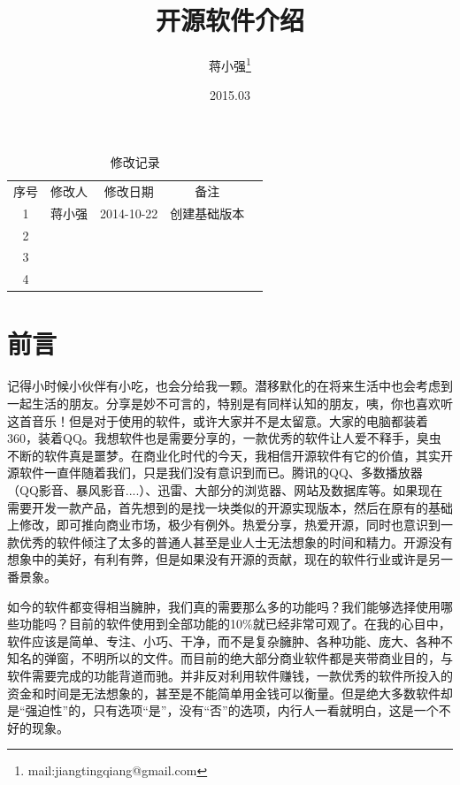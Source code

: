 \documentclass[paper=a4,fontsize=11pt]{article}
\begin{document}
	\title{开源软件介绍}		
	\author{蒋小强\footnote{mail:jiangtingqiang@gmail.com}}
	\date{2015.03}	
	
	\maketitle %
	\clearpage
	
	\begin{table}\caption{修改记录}					
		\medskip
		\centering		
		\begin{tabular}{|c|c|c|c|c|}
			\hline
			\multirow{1}{*}{序号}
			& \multicolumn{1}{|c|}{修改人}  
			& \multicolumn{1}{|c|}{修改日期} 
			& \multicolumn{1}{|c|}{备注}\\			
			\cline{1-4}
			1 & 蒋小强 & 2014-10-22 & 创建基础版本\\
			\hline
			2 & & &\\
			\hline
			3 & & &\\
			\hline
			4 & & &\\
			\hline
		\end{tabular}
	\end{table}
	\clearpage
	\section{前言}
	
	记得小时候小伙伴有小吃，也会分给我一颗。潜移默化的在将来生活中也会考虑到一起生活的朋友。分享是妙不可言的，特别是有同样认知的朋友，咦，你也喜欢听这首音乐！但是对于使用的软件，或许大家并不是太留意。大家的电脑都装着360，装着QQ。我想软件也是需要分享的，一款优秀的软件让人爱不释手，臭虫不断的软件真是噩梦。在商业化时代的今天，我相信开源软件有它的价值，其实开源软件一直伴随着我们，只是我们没有意识到而已。腾讯的QQ、多数播放器（QQ影音、暴风影音....）、迅雷、大部分的浏览器、网站及数据库等。如果现在需要开发一款产品，首先想到的是找一块类似的开源实现版本，然后在原有的基础上修改，即可推向商业市场，极少有例外。热爱分享，热爱开源，同时也意识到一款优秀的软件倾注了太多的普通人甚至是业人士无法想象的时间和精力。开源没有想象中的美好，有利有弊，但是如果没有开源的贡献，现在的软件行业或许是另一番景象。	
	
	如今的软件都变得相当臃肿，我们真的需要那么多的功能吗？我们能够选择使用哪些功能吗？目前的软件使用到全部功能的10\%就已经非常可观了。在我的心目中，软件应该是简单、专注、小巧、干净，而不是复杂臃肿、各种功能、庞大、各种不知名的弹窗，不明所以的文件。而目前的绝大部分商业软件都是夹带商业目的，与软件需要完成的功能背道而驰。并非反对利用软件赚钱，一款优秀的软件所投入的资金和时间是无法想象的，甚至是不能简单用金钱可以衡量。但是绝大多数软件却是“强迫性”的，只有选项“是”，没有“否”的选项，内行人一看就明白，这是一个不好的现象。
	
\end{document}
